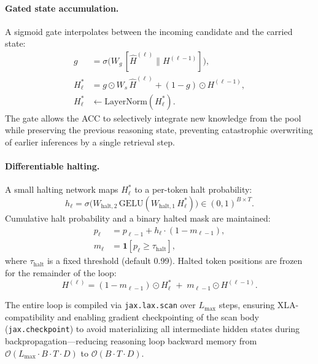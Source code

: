 \documentclass[11pt]{article}
\begin{document}
\paragraph{Gated state accumulation.}
A sigmoid gate interpolates between the incoming candidate and the carried
state:
\begin{align}
  g\phantom{^*_\ell}
    &= \sigma\!\bigl(W_g\,[\hat{H}^{(\ell)} \| H^{(\ell-1)}]\bigr),\\
  H^*_\ell
    &= g \odot W_s\,\hat{H}^{(\ell)} + (1 - g) \odot H^{(\ell-1)},\\
  H^*_\ell
    &\leftarrow \mathrm{LayerNorm}(H^*_\ell).
\end{align}
The gate allows the ACC to selectively integrate new knowledge from the pool
while preserving the previous reasoning state, preventing catastrophic
overwriting of earlier inferences by a single retrieval step.

\paragraph{Differentiable halting.}
A small halting network maps $H^*_\ell$ to a per-token halt probability:
\begin{equation}
  h_\ell = \sigma\!\bigl(W_{\mathrm{halt},2}\,
    \mathrm{GELU}(W_{\mathrm{halt},1}\,H^*_\ell)\bigr) \in (0,1)^{B \times T}.
\end{equation}
Cumulative halt probability and a binary halted mask are maintained:
\begin{align}
  p_\ell &= p_{\ell-1} + h_\ell \cdot (1 - m_{\ell-1}),\\
  m_\ell &= \mathbf{1}[p_\ell \geq \tau_{\mathrm{halt}}],
\end{align}
where $\tau_{\mathrm{halt}}$ is a fixed threshold (default 0.99).
Halted token positions are frozen for the remainder of the loop:
\begin{equation}
  H^{(\ell)} = (1 - m_{\ell-1}) \odot H^*_\ell\;+\;m_{\ell-1} \odot H^{(\ell-1)}.
\end{equation}

The entire loop is compiled via \texttt{jax.lax.scan} over $L_{\max}$ steps,
ensuring XLA-compatibility and enabling gradient checkpointing of the scan body
(\texttt{jax.checkpoint}) to avoid materializing all intermediate hidden states
during backpropagation—reducing reasoning loop backward memory from
$\mathcal{O}(L_{\max} \cdot B \cdot T \cdot D)$ to
$\mathcal{O}(B \cdot T \cdot D)$.

\end{document}

